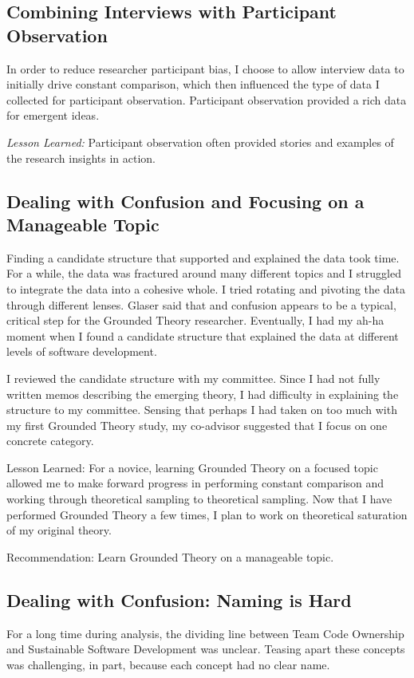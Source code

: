 \subsection{Combining Interviews with Participant Observation}
In order to reduce researcher participant bias, I choose to allow interview data to initially drive constant comparison, which then influenced the type of data I collected for participant observation. Participant observation provided a rich data for emergent ideas. 

\textit{Lesson Learned:} Participant observation often provided stories and examples of the research insights in action.
\subsection{Dealing with Confusion and Focusing on a Manageable Topic}
Finding a candidate structure that supported and explained the data took time. For a while, the data was fractured around many different topics and I struggled to integrate the data into a cohesive whole. I tried rotating and pivoting the data through different lenses. Glaser said that  \cite{GlaserMillValleyWorkshop} and confusion appears to be a typical, critical step for the Grounded Theory researcher. Eventually, I had my ah-ha moment when I found a candidate structure that explained the data at different levels of software development. 

I reviewed the candidate structure with my committee. Since I had not fully written memos describing the emerging theory, I had difficulty in explaining the structure to my committee. Sensing that perhaps I had taken on too much with my first Grounded Theory study, my co-advisor suggested that I focus on one concrete category. 

Lesson Learned: For a novice, learning Grounded Theory on a focused topic allowed me to make forward progress in performing constant comparison and working through theoretical sampling to theoretical sampling. Now that I have performed Grounded Theory a few times, I plan to work on theoretical saturation of my original theory.

Recommendation: Learn Grounded Theory on a manageable topic.
\subsection{Dealing with Confusion: Naming is Hard}
For a long time during analysis, the dividing line between Team Code Ownership and Sustainable Software Development was unclear. Teasing apart these concepts was challenging, in part, because each concept had no clear name. 

